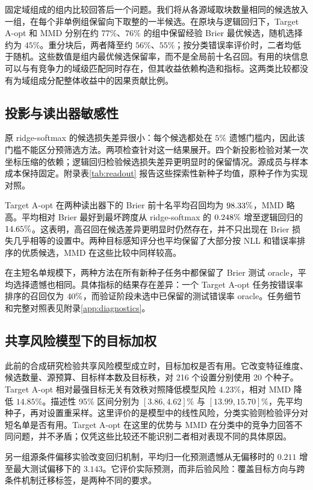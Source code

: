 固定域组成的组内比较回答后一个问题。我们将从各源域取块数量相同的候选放入一组，在每个非单例组保留向下取整的一半候选。在原块与逻辑回归下，Target A-opt 和 MMD 分别在约 $77\%$、$76\%$ 的组中保留经验 Brier 最优候选，随机选择约为 $45\%$。重分块后，两者降至约 $56\%$、$55\%$；按分类错误率评价时，二者均低于随机。这些数值是组内最优候选保留率，而不是全局前十名召回。有用的块信息可以与有竞争力的域级匹配同时存在，但其收益依赖构造和指标。这两类比较都没有为域组成分配整体收益中的因果贡献比例。

\subsection{投影与读出器敏感性}
\label{sec:readout}
原 ridge-softmax 的候选损失差异很小：每个候选都处在 $5\%$ 遗憾门槛内，因此该门槛不能区分预筛选方法。两项检查针对这一结果展开。四个新投影检验对某一次坐标压缩的依赖；逻辑回归检验候选损失差异更明显时的保留情况。源成员与样本成本保持固定。附录表\ref{tab:readout} 报告这些探索性新种子均值，原种子作为实现对照。

Target A-opt 在两种读出器下的 Brier 前十名平均召回均为 $98.33\%$，MMD 略高。平均相对 Brier 最好到最坏跨度从 ridge-softmax 的 $0.248\%$ 增至逻辑回归的 $14.65\%$。这表明，高召回在候选差异更明显时仍然存在，并不只出现在 Brier 损失几乎相等的设置中。两种目标感知评分也平均保留了大部分按 NLL 和错误率排序的优质候选，MMD 在这些比较中同样较高。

在主短名单规模下，两种方法在所有新种子任务中都保留了 Brier 测试 oracle，平均选择遗憾也相同。具体指标的结果存在差异：一个 Target A-opt 任务按错误率排序的召回仅为 $40\%$，而验证阶段未选中已保留的测试错误率 oracle。任务细节和完整对照表见附录\ref{app:diagnostics}。

\subsection{共享风险模型下的目标加权}
此前的合成研究检验共享风险模型成立时，目标加权是否有用。它改变特征维度、候选数量、源预算、目标样本数及目标秩，对 216 个设置分别使用 20 个种子。Target A-opt 相对最强目标无关有效秩对照降低模型风险 $4.23\%$，相对 MMD 降低 $14.85\%$。描述性 95\% 区间分别为 $[3.86,4.62]\%$ 与 $[13.99,15.70]\%$，先平均种子，再对设置重采样。这里评价的是模型中的线性风险，分类实验则检验评分对短名单是否有用。Target A-opt 在这里的优势与 MMD 在分类中的竞争力回答不同问题，并不矛盾；仅凭这些比较还不能识别二者相对表现不同的具体原因。

另一组源条件偏移实验改变回归机制，平均归一化预测遗憾从无偏移时的 $0.211$ 增至最大测试偏移下的 $3.143$。它评价实际预测，而非后验风险：覆盖目标方向与跨条件机制迁移标签，是两种不同的要求。

